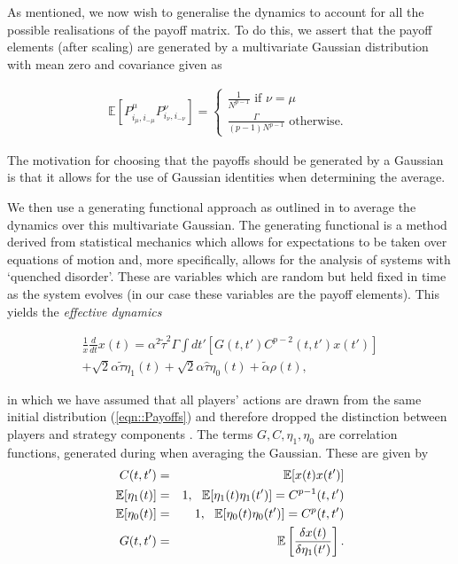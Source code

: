 \documentclass[sigconf]{aamas}
\newcommand{\payoff}[2]{P^{#2}_{#1_#2, #1_{-#2}}}
\newcommand{\talpha}{\tilde{\alpha}}
\newcommand{\ttau}{\tilde{\tau}}
\newcommand{\htau}{\hat{\tau}}
\begin{document}
As mentioned, we now wish to generalise the dynamics to account for all the possible realisations of the payoff matrix. To do this, we assert that the payoff elements (after scaling) are generated by a multivariate Gaussian distribution with mean zero and covariance given as

%
\begin{equation}
\label{eqn::Payoffs}
    \begin{split}
        \mathbb{E}\left [ \payoff{i}{\mu} \payoff{i}{\nu} \right] = \begin{cases}
        \frac{1}{N^{p-1}}  \text{ if } \nu = \mu \\
        \frac{\Gamma}{(p-1) N^{p-1}} \text{ otherwise. }
        \end{cases}
    \end{split}
\end{equation}

The motivation for choosing that the payoffs should be generated by a Gaussian is that it allows for the use of Gaussian identities when determining the average.

We then use a generating functional approach as outlined in \cite{Mezard1986} to average the dynamics over this multivariate Gaussian. The generating functional is a method derived from statistical mechanics which allows for expectations to be taken over equations of motion and, more specifically, allows for the analysis of systems with `quenched disorder'. These are variables which are random but held fixed in time as the system evolves (in our case these variables are the payoff elements). This yields the \textit{effective dynamics}

\begin{equation}
    \label{eqn::EffectiveDynamics}
    \begin{split}
            \frac{1}{x} \frac{d}{dt} x(t) = \alpha^2 \ttau^2 \Gamma \int dt' \left [G(t, t')C^{p - 2}(t, t') x(t') \right ]\\ + \sqrt{2} \alpha \ttau \eta_1(t) + \sqrt{2} \alpha \htau \eta_0(t) + \talpha \rho(t), 
    \end{split}
\end{equation}

in which we have assumed that all players' actions are drawn from the same initial distribution (\ref{eqn::Payoffs})
 and therefore dropped the distinction between players and strategy components . The terms $G, C, \eta_1, \eta_0$ are correlation functions, generated during when averaging the Gaussian. These are given by 
\begin{eqnarray*}
        C(t, t') & = & \mathbb{E}[x(t) x(t')] \\
        \mathbb{E}[\eta_1(t)] & = & 1, \text{ \space } \mathbb{E}[\eta_1(t) \eta_1(t')]  =  C^{p-1}(t, t') \\
        \mathbb{E}[\eta_0(t)] & = & 1, \text{ \space } \mathbb{E}[\eta_0(t) \eta_0(t')] = C^{p}(t, t') \\
        G(t, t') & = & \mathbb{E}\left [ \frac{\delta x(t)}{ \delta \eta_1(t')} \right].
\end{eqnarray*}
\end{document}
